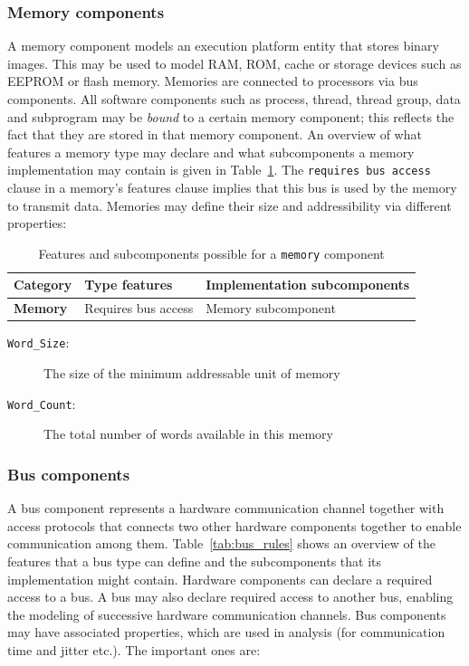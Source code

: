 \subsubsection{Memory components}
A memory component models an execution platform entity that stores
binary images. This may be used to model RAM, ROM, cache or storage
devices such as EEPROM or flash memory. Memories are connected to
processors via bus components. All software components such as
process, thread, thread group, data and subprogram may be \emph{bound}
to a certain memory component; this reflects the fact that they are
stored in that memory component. An overview of what features a memory
type may declare and what subcomponents a memory implementation may
contain is given in Table~\ref{tab:mem_rules}. The \texttt{requires
  bus access} clause in a memory's features clause implies that this
bus is used by the memory to transmit data. Memories may define their
size and addressibility via different properties:

\begin{table}
\centering
\begin{tabular}{|l|l|l|}
\hline
\textbf{Category} & \textbf{Type features} & \textbf{Implementation
  subcomponents} \\
\hline
\textbf{Memory} & Requires bus access & Memory subcomponent\\
\hline
\end{tabular}
\caption{Features and subcomponents possible for a \texttt{memory}
  component}
\label{tab:mem_rules}
\end{table}

\begin{description}
\item[\texttt{Word\_Size}:]{The size of the minimum addressable unit
  of memory}
\item[\texttt{Word\_Count}:]{The total number of words available in
  this memory}
\end{description}

\subsubsection{Bus components}
A bus component represents a hardware communication channel together
with access protocols that connects two other hardware components
together to enable communication among them. Table~\ref{tab:bus_rules}
shows an overview of the features that a bus type can define and the
subcomponents that its implementation might contain. Hardware
components can declare a required access to a bus. A bus may also
declare required access to another bus, enabling the modeling of
successive hardware communication channels. Bus components may have
associated properties, which are used in analysis (for communication
time and jitter etc.). The important ones are:

